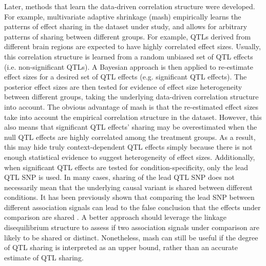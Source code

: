 Later, methods that learn the data-driven correlation structure were developed. For example, multivariate adaptive shrinkage (mash) empirically learns the patterns of effect sharing in the dataset under study, and allows for arbitrary patterns of sharing between different groups. For example, QTLs derived from different brain regions are expected to have highly correlated effect sizes. Usually, this correlation structure is learned from a random unbiased set of QTL effects (i.e. non-significant QTLs). A Bayesian approach is then applied to re-estimate effect sizes for a desired set of QTL effects (e.g. significant QTL effects). The posterior effect sizes are then tested for evidence of effect size heterogeneity between different groups, taking the underlying data-driven correlation structure into account. The obvious advantage of mash is that the re-estimated effect sizes take into account the empirical correlation structure in the dataset. However, this also means that significant QTL effects' sharing may be overestimated when the null QTL effects are highly correlated among the treatment groups. As a result, this may hide truly context-dependent QTL effects simply because there is not enough statistical evidence to suggest heterogeneity of effect sizes. Additionally, when significant QTL effects are tested for condition-specificity, only the lead QTL SNP is used. In many cases, sharing of the lead QTL SNP does not necessarily mean that the underlying causal variant is shared between different conditions. It has been previously shown that comparing the lead SNP between different association signals can lead to the false conclusion that the effects under comparison are shared \cite{Liu2019-fv}. A better approach should leverage the linkage disequilibrium structure to assess if two association signals under comparison are likely to be shared or distinct. Nonetheless, mash can still be useful if the degree of QTL sharing is interpreted as an upper bound, rather than an accurate estimate of QTL sharing.\\



